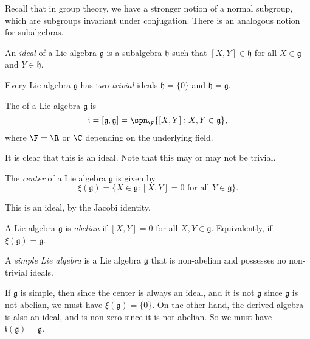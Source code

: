 \documentclass[a4paper]{article}
\begin{document}
Recall that in group theory, we have a stronger notion of a normal subgroup, which are subgroups invariant under conjugation. There is an analogous notion for subalgebras.
\begin{defi}[Ideal]
  An \emph{ideal} of a Lie algebra $\mathfrak{g}$ is a subalgebra $\mathfrak{h}$ such that $[X, Y] \in \mathfrak{h}$ for all $X \in \mathfrak{g}$ and $Y \in \mathfrak{h}$.
\end{defi}

\begin{eg}
  Every Lie algebra $\mathfrak{g}$ has two \emph{trivial} ideals $\mathfrak{h} = \{0\}$ and $\mathfrak{h} = \mathfrak{g}$.
\end{eg}

\begin{defi}
  The  of a Lie algebra $\mathfrak{g}$ is
  \[
    \mathfrak{i} = [\mathfrak{g}, \mathfrak{g}] = \spn_\F\{[X, Y]: X, Y \in \mathfrak{g}\},
  \]
  where $\F = \R$ or $\C$ depending on the underlying field.
\end{defi}
It is clear that this is an ideal. Note that this may or may not be trivial.

\begin{defi}
  The \emph{center} of a Lie algebra $\mathfrak{g}$ is given by
  \[
    \xi(\mathfrak{g}) = \{X \in \mathfrak{g}: [X, Y] = 0\text{ for all }Y \in \mathfrak{g}\}.
  \]
\end{defi}
This is an ideal, by the Jacobi identity.

\begin{defi}
  A Lie algebra $\mathfrak{g}$ is \emph{abelian} if $[X, Y] = 0$ for all $X, Y \in \mathfrak{g}$. Equivalently, if $\xi(\mathfrak{g}) = \mathfrak{g}$.
\end{defi}

\begin{defi}
  A \emph{simple Lie algebra} is a Lie algebra $\mathfrak{g}$ that is non-abelian and possesses no non-trivial ideals.
\end{defi}
If $\mathfrak{g}$ is simple, then since the center is always an ideal, and it is not $\mathfrak{g}$ since $\mathfrak{g}$ is not abelian, we must have $\xi(\mathfrak{g}) = \{0\}$. On the other hand, the derived algebra is also an ideal, and is non-zero since it is not abelian. So we must have $\mathfrak{i}(\mathfrak{g}) = \mathfrak{g}$.
\end{document}
